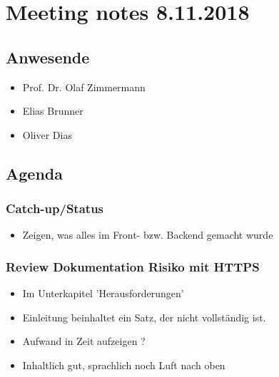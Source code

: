 \hypertarget{meeting-notes-8.11.2018}{%
\section*{Meeting notes 8.11.2018}\label{meeting-notes-8.11.2018}}

\hypertarget{anwesende}{%
\subsection*{Anwesende}\label{anwesende}}

\begin{itemize}

\item
  Prof. Dr. Olaf Zimmermann
\item
  Elias Brunner
\item
  Oliver Dias
\end{itemize}

\hypertarget{agenda}{%
\subsection*{Agenda}\label{agenda}}

\hypertarget{catch-upux2fstatus}{%
\subsubsection*{Catch-up/Status}\label{catch-upux2fstatus}}

\begin{itemize}

\item
  Zeigen, was alles im Front- bzw. Backend gemacht wurde
\end{itemize}

\hypertarget{review-dokumentation-risiko-mit-https}{%
\subsubsection*{Review Dokumentation Risiko mit
HTTPS}\label{review-dokumentation-risiko-mit-https}}

\begin{itemize}
\item
  Im Unterkapitel 'Herausforderungen'
\item
  Einleitung beinhaltet ein Satz, der nicht vollständig ist.
\item
  Aufwand in Zeit aufzeigen ?
\item
  Inhaltlich gut, sprachlich noch Luft nach oben
\end{itemize}


